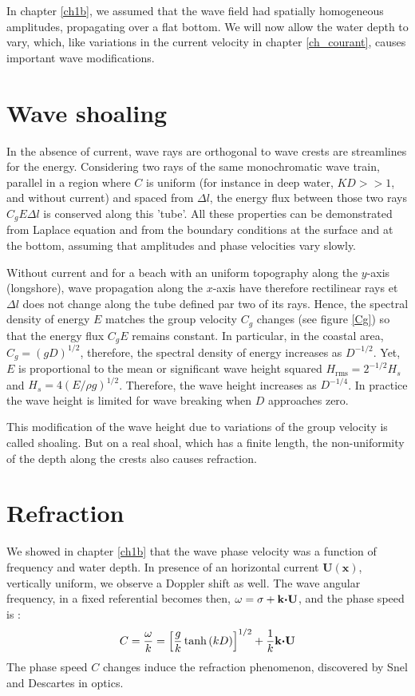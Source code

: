 In chapter \ref{ch1b}, we assumed that the wave field had spatially homogeneous amplitudes, propagating over a flat bottom. 
We will now allow the water depth to vary, which, like variations in the current velocity in chapter \ref{ch_courant}, causes important 
wave modifications. 

\section{Wave shoaling}
In the absence of current, wave rays are orthogonal to wave crests are streamlines for the energy.
Considering two rays of the same monochromatic wave train, parallel in a
region where $C$ is uniform (for instance in deep water, $KD>>1$, and without
current) and spaced from $\Delta l$, the energy flux between those two rays
 $C_g E \Delta l$ is conserved along this 'tube'. All these properties can be
 demonstrated from Laplace equation and from the boundary conditions at the surface
 and at the bottom, assuming that amplitudes and phase velocities vary slowly.


Without current and for a beach with an uniform topography along the $y$-axis 
(longshore), wave propagation along the $x$-axis have therefore rectilinear
rays et $\Delta l$ does not change along the tube defined par two of its rays.
Hence, the spectral density of energy $E$ matches the group velocity $C_g$ changes
(see figure \ref{Cg}) so that the energy flux $C_g E$ remains constant.
In particular, in the coastal area, $C_g=\left(gD\right)^{1/2}$, therefore,
the spectral density of energy increases as $D^{-1/2}$. Yet, $E$ is proportional
to the mean or significant wave height squared $H_{\mathrm{rms}}=2^{-1/2} H_s$ and
$H_s=4 \left(E/\rho g\right)^{1/2}$. Therefore, the wave height increases as
$D^{-1/4}$. In practice the wave height is limited for wave breaking when  $D$ approaches zero. 

This modification of the wave height due to variations of the group velocity is called 
shoaling.  But on a real shoal, which has a finite length, the non-uniformity of the depth along the crests 
also causes refraction. 

\section{Refraction}

We showed in chapter \ref{ch1b} that the wave phase velocity was a
function of frequency and water depth. In presence of an horizontal current
${\mathbf U}({\mathbf x})$, vertically uniform, we observe a Doppler
shift as well. The wave angular frequency, in a fixed referential becomes
then, $\omega=\sigma+{\mathbf k}\mbox{\boldmath $\cdot$}{\mathbf U}$,  and the phase speed 
is :
\begin{equation}
    C=\frac{\omega}{k}
    = \left[ \frac{g}{k} \tanh \left(k D \right) \right]^{1/2}
    +\frac{1}{k}{\mathbf k}\mbox{\boldmath $\cdot$}{\mathbf U}
\end{equation}
The phase speed $C$ changes induce the refraction phenomenon, discovered
by Snel and Descartes in optics.


